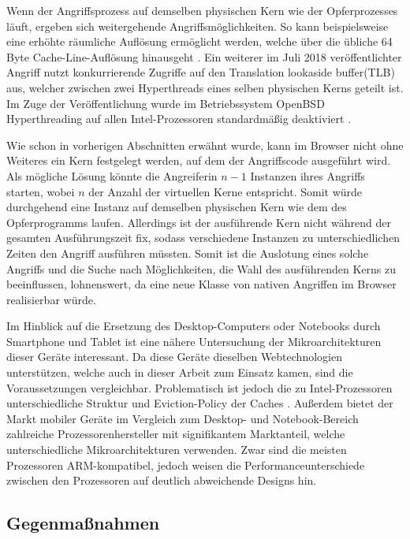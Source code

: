Wenn der Angriffsprozess auf demselben physischen Kern wie der Opferprozesses läuft, ergeben sich weitergehende Angriffsmöglichkeiten.
So kann beispielsweise eine erhöhte räumliche Auflösung ermöglicht werden, welche über die übliche 64 Byte Cache-Line-Auflösung hinausgeht \cite{MemJam}.
Ein weiterer im Juli 2018 veröffentlichter Angriff \cite{TLBleed} nutzt konkurrierende Zugriffe auf den Translation lookaside buffer(TLB) aus, welcher zwischen zwei Hyperthreads eines selben physischen Kerns geteilt ist.
Im Zuge der Veröffentlichung wurde im Betriebssystem OpenBSD Hyperthreading auf allen Intel-Prozessoren standardmäßig deaktiviert \cite{OpenBSDHyperthreading}.

Wie schon in vorherigen Abschnitten erwähnt wurde, kann im Browser nicht ohne Weiteres ein Kern festgelegt werden, auf dem der Angriffscode ausgeführt wird.
Als mögliche Lösung könnte die Angreiferin $n-1$ Instanzen ihres Angriffs starten, wobei $n$ der Anzahl der virtuellen Kerne entspricht. 
Somit würde durchgehend eine Instanz auf demselben physischen Kern wie dem des Opferprogramms laufen.
Allerdings ist der ausführende Kern nicht während der gesamten Ausführungszeit fix, sodass verschiedene Instanzen zu unterschiedlichen Zeiten den Angriff ausführen müssten.
Somit ist die Auslotung eines solche Angriffs und die Suche nach Möglichkeiten, die Wahl des ausführenden Kerns zu beeinflussen, lohnenswert, da eine neue Klasse von nativen Angriffen im Browser realisierbar würde.


Im Hinblick auf die Ersetzung des Desktop-Computers oder Notebooks durch Smartphone und Tablet ist eine nähere Untersuchung der Mikroarchitekturen dieser Geräte interessant.
Da diese Geräte dieselben Webtechnologien unterstützen, welche auch in dieser Arbeit zum Einsatz kamen, sind die Voraussetzungen vergleichbar.
Problematisch ist jedoch die zu Intel-Prozessoren unterschiedliche Struktur und Eviction-Policy der Caches \cite{ARMCacheAttacks}.
Außerdem bietet der Markt mobiler Geräte im Vergleich zum Desktop- und Notebook-Bereich zahlreiche Prozessorenhersteller mit signifikantem Marktanteil, welche unterschiedliche Mikroarchitekturen verwenden.
Zwar sind die meisten Prozessoren ARM-kompatibel, jedoch weisen die Performanceunterschiede zwischen den Prozessoren \cite{GeekbenchMobile} auf deutlich abweichende Designs hin. 

\subsection{Gegenmaßnahmen} 

